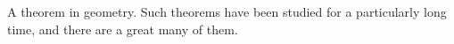 A theorem in geometry. Such theorems have been studied for
a particularly long time, and there are a great many of them.